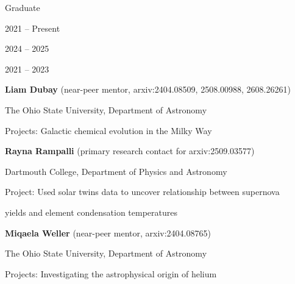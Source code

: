 \documentclass[cv.tex]{subfiles}
\begin{document}
\vspace{1mm}
\noindent
{\color{themecolor} \large Graduate}
\par\noindent
\parbox{0.18\textwidth}{%
	\vspace{-1mm}
	\raggedleft

	\vspace{1mm}
	2021 -- Present \par
	\null \par
	\null \par

	\vspace{1mm}
	2024 -- 2025 \par
	\null \par
	\null \par
	\null \par

	\vspace{1mm}
	2021 -- 2023 \par
	\null \par
	\null \par

}
\hspace{1mm}
\parbox{0.8\textwidth}{%

	\vspace{1mm}
	\textbf{Liam Dubay} (near-peer mentor, arxiv:2404.08509, 2508.00988, 2608.26261) \par
	The Ohio State University, Department of Astronomy \par
	Projects: Galactic chemical evolution in the Milky Way \par

	\vspace{1mm}
	\textbf{Rayna Rampalli} (primary research contact for arxiv:2509.03577) \par
	Dartmouth College, Department of Physics and Astronomy \par
	Project: Used solar twins data to uncover relationship between supernova \par
	yields and element condensation temperatures \par

	\vspace{1mm}
	\textbf{Miqaela Weller} (near-peer mentor, arxiv:2404.08765) \par
	The Ohio State University, Department of Astronomy \par
	Projects: Investigating the astrophysical origin of helium \par

}
\end{document}
